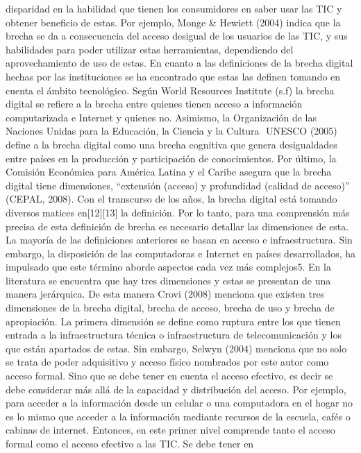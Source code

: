 \begin{enumerate}
  disparidad en la habilidad que tienen los consumidores en saber usar
  las TIC y obtener beneficio de estas. Por ejemplo, Monge \& Hewiett
  (2004) indica que la brecha se da a consecuencia del acceso desigual
  de los usuarios de las TIC, y sus habilidades para poder utilizar
  estas herramientas, dependiendo del aprovechamiento de uso de estas.
  En cuanto a las definiciones de la brecha digital hechas por las
  instituciones se ha encontrado que estas las definen tomando en cuenta
  el ámbito tecnológico. Según World Resources Institute (s.f) la brecha
  digital se refiere a la brecha entre quienes tienen acceso a
  información computarizada e Internet y quienes no. Asimismo, la
  Organización de las Naciones Unidas para la Educación, la Ciencia y la
  Cultura  UNESCO (2005) define a la brecha digital como una brecha
  cognitiva que genera desigualdades entre países en la producción y
  participación de conocimientos. Por último, la Comisión Económica para
  América Latina y el Caribe asegura que la brecha digital tiene
  dimensiones, ``extensión (acceso) y profundidad (calidad de acceso)''
  (CEPAL, 2008). Con el transcurso de los años, la brecha digital está
  tomando diversos matices en{[}12{]}{[}13{]} la definición. Por lo
  tanto, para una comprensión más precisa de esta definición de brecha
  es necesario detallar las dimensiones de esta. La mayoría de las
  definiciones anteriores se basan en acceso e infraestructura. Sin
  embargo, la disposición de las computadoras e Internet en países
  desarrollados, ha impulsado que este término aborde aspectos cada vez
  más complejos5. En la literatura se encuentra que hay tres dimensiones
  y estas se presentan de una manera jerárquica. De esta manera Crovi
  (2008) menciona que existen tres dimensiones de la brecha digital,
  brecha de acceso, brecha de uso y brecha de apropiación. La primera
  dimensión se define como ruptura entre los que tienen entrada a la
  infraestructura técnica o infraestructura de telecomunicación y los
  que están apartados de estas. Sin embargo, Selwyn (2004) menciona que
  no solo se trata de poder adquisitivo y acceso físico nombrados por
  este autor como acceso formal. Sino que se debe tener en cuenta el
  acceso efectivo, es decir se debe considerar más allá de la capacidad
  y distribución del acceso. Por ejemplo, para acceder a la información
  desde un celular o una computadora en el hogar no es lo mismo que
  acceder a la información mediante recursos de la escuela, cafés o
  cabinas de internet. Entonces, en este primer nivel comprende tanto el
  acceso formal como el acceso efectivo a las TIC. Se debe tener en

\end{enumerate}
